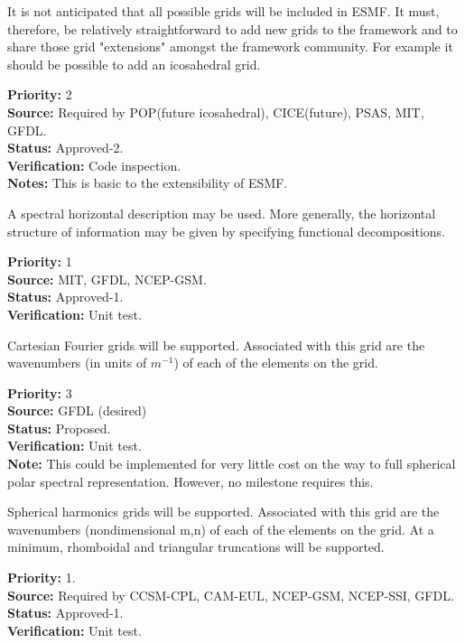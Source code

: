 It is not anticipated that all possible grids will be included in
ESMF. It must, therefore, be relatively straightforward to add
new grids to the framework and to share those grid "extensions"
amongst the framework community. For example it should be possible
to add an icosahedral grid.
\begin{reqlist}
{\bf Priority:} 2\\
{\bf Source:} Required by POP(future icosahedral), CICE(future), 
PSAS, MIT, GFDL.  \\
{\bf Status:} Approved-2. \\
{\bf Verification:} Code inspection. \\
{\bf Notes:} This is basic to the extensibility of ESMF.
\end{reqlist}


A spectral horizontal description may be used.  More generally, the horizontal
structure of information may be given by specifying functional decompositions.
\begin{reqlist}
{\bf Priority:} 1 \\
{\bf Source:} MIT, GFDL, NCEP-GSM.  \\
{\bf Status:} Approved-1. \\
{\bf Verification:} Unit test.
\end{reqlist}

Cartesian Fourier grids will be supported.  Associated with this grid are the
wavenumbers (in units of $m^{-1}$) of each of the elements on the grid.
\begin{reqlist}
{\bf Priority:} 3 \\
{\bf Source:} GFDL (desired)\\
{\bf Status:} Proposed. \\
{\bf Verification:} Unit test.\\
{\bf Note:} This could be implemented for very little cost on the way to full spherical polar
spectral representation. However, no milestone requires this.\\
\end{reqlist}

Spherical harmonics grids will be supported.  Associated with this grid are the
wavenumbers (nondimensional m,n) of each of the elements on the grid.  At a
minimum, rhomboidal and triangular truncations will be supported.
\begin{reqlist}
{\bf Priority:} 1. \\
{\bf Source:} Required by CCSM-CPL, CAM-EUL, NCEP-GSM, NCEP-SSI, GFDL. \\
{\bf Status:} Approved-1. \\
{\bf Verification:} Unit test.
\end{reqlist}

